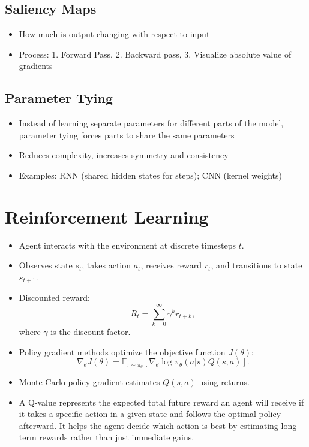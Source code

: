 \documentclass[12pt,a4paper]{article}
\begin{document}
\subsection{Saliency Maps}
\begin{itemize}
    \item How much is output changing with respect to input
    \item Process: 1. Forward Pass, 2. Backward pass, 3. Visualize absolute value of gradients 
\end{itemize}
\subsection{Parameter Tying}
\begin{itemize}
    \item Instead of learning separate parameters for different parts of the model, parameter tying forces parts to share the same parameters
    \item Reduces complexity, increases symmetry and consistency 
    \item Examples: RNN (shared hidden states for steps); CNN (kernel weights)
\end{itemize}
\pagebreak
\section{Reinforcement Learning}
\begin{itemize}
    \item Agent interacts with the environment at discrete timesteps $t$.
    \item Observes state $s_t$, takes action $a_t$, receives reward $r_t$, and transitions to state $s_{t+1}$.
    \item Discounted reward:
    \[ R_t = \sum_{k=0}^\infty \gamma^k r_{t+k}, \]
    where $\gamma$ is the discount factor.
    \item Policy gradient methods optimize the objective function $J(\theta)$:
    \[ \nabla_\theta J(\theta) = \mathbb{E}_{\tau \sim \pi_\theta}[\nabla_\theta \log \pi_\theta(a|s) Q(s, a)]. \]
    \item Monte Carlo policy gradient estimates $Q(s, a)$ using returns.
    \item A Q-value represents the expected total future reward an agent will receive if it takes a specific action in a given state and follows the optimal policy afterward. It helps the agent decide which action is best by estimating long-term rewards rather than just immediate gains.
\end{itemize}
\end{document}
